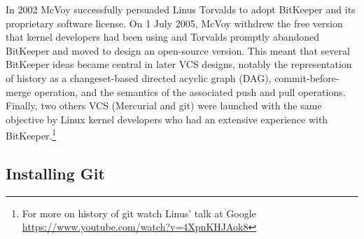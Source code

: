\documentclass{article}
\begin{document}
In 2002 McVoy successfully persuaded Linus Torvalds to adopt BitKeeper
and its proprietary software license. On 1 July 2005,
McVoy withdrew the free version that kernel developers had
been using and Torvalds promptly abandoned BitKeeper and moved
to design an open-source version. This meant that several BitKeeper
ideas became central in later VCS designs, notably the
representation of history as a changeset-based directed acyclic graph (DAG),
commit-before-merge operation, and the semantics of the associated
push and pull operations.
Finally, two others VCS (Mercurial and git) were launched with
the same objective by Linux kernel developers who had an extensive
experience with BitKeeper.\footnote{For more on history of git watch
  Linus' talk at Google \url{https://www.youtube.com/watch?v=4XpnKHJAok8}}

\fi

\subsection{Installing Git}
\end{document}
